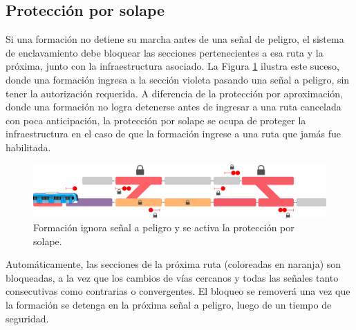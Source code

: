 \subsection{Protección por solape}

	Si una formación no detiene su marcha antes de una señal de peligro, el sistema de enclavamiento debe bloquear las secciones pertenecientes a esa ruta y la próxima, junto con la infraestructura asociado. La Figura \ref{fig:ACG_solape_1} ilustra este suceso, donde una formación ingresa a la sección violeta pasando una señal a peligro, sin tener la autorización requerida. A diferencia de la protección por aproximación, donde una formación no logra detenerse antes de ingresar a una ruta cancelada con poca anticipación, la protección por solape se ocupa de proteger la infraestructura en el caso de que la formación ingrese a una ruta que jamás fue habilitada.

    \begin{figure}[!h]
        \centering
        \includegraphics[width=1\textwidth]{Figuras/solape}
        \centering\caption{Formación ignora señal a peligro y se activa la protección por solape.}
        \label{fig:ACG_solape_1}
    \end{figure}
    
    Automáticamente, las secciones de la próxima ruta (coloreadas en naranja) son bloqueadas, a la vez que los cambios de vías cercanos y todas las señales tanto consecutivas como contrarias o convergentes. El bloqueo se removerá una vez que la formación se detenga en la próxima señal a peligro, luego de un tiempo de seguridad.